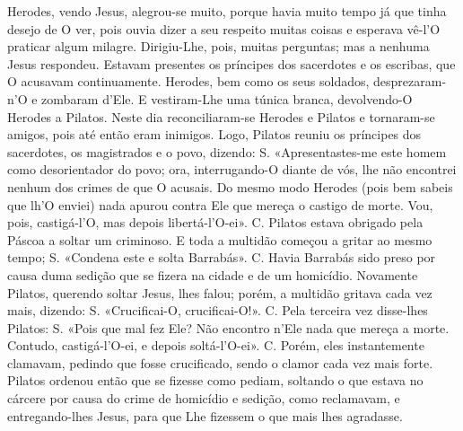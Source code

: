 \begin{paracol}{2}
{Herodes, vendo Jesus, alegrou-se muito, porque havia muito tempo já que tinha desejo de O ver, pois ouvia dizer a seu respeito muitas coisas e esperava vê-l’O praticar algum milagre. Dirigiu-Lhe, pois, muitas perguntas; mas a nenhuma Jesus respondeu. Estavam presentes os príncipes dos sacerdotes e os escribas, que O acusavam continuamente. Herodes, bem como os seus soldados, desprezaram-n’O e zombaram d’Ele. E vestiram-Lhe uma túnica branca, devolvendo-O Herodes a Pilatos. Neste dia reconciliaram-se Herodes e Pilatos e tornaram-se amigos, pois até então eram inimigos. Logo, Pilatos reuniu os príncipes dos sacerdotes, os magistrados e o povo, dizendo: {\redx S.} «Apresentastes-me este homem como desorientador do povo; ora, interrugando-O diante de vós, lhe não encontrei nenhum dos crimes de que O acusais. Do mesmo modo Herodes (pois bem sabeis que lh’O enviei) nada apurou contra Ele que mereça o castigo de morte. Vou, pois, castigá-l’O, mas depois libertá-l’O-ei». {\redx C.} Pilatos estava obrigado pela Páscoa a soltar um criminoso. E toda a multidão começou a gritar ao mesmo tempo; {\redx S.} «Condena este e solta Barrabás». {\redx C.} Havia Barrabás sido preso por causa duma sedição que se fizera na cidade e de um homicídio. Novamente Pilatos, querendo soltar Jesus, lhes falou; porém, a multidão gritava cada vez mais, dizendo: {\redx S.} «Crucificai-O, crucificai-O!». {\redx C.} Pela terceira vez disse-lhes Pilatos: {\redx S.} «Pois que mal fez Ele? Não encontro n’Ele nada que mereça a morte. Contudo, castigá-l’O-ei, e depois soltá-l’O-ei». {\redx C.} Porém, eles instantemente clamavam, pedindo que fosse crucificado, sendo o clamor cada vez mais forte. Pilatos ordenou então que se fizesse como pediam, soltando o que estava no cárcere por causa do crime de homicídio e sedição, como reclamavam, e entregando-lhes Jesus, para que Lhe fizessem o que mais lhes agradasse.
}\switchcolumn*\latim{
}
\end{paracol}
